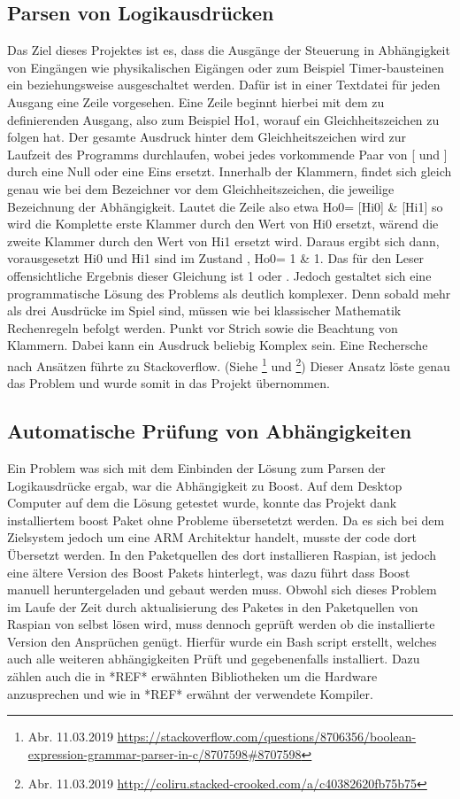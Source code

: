 \subsection{Parsen von Logikausdrücken}
Das Ziel dieses Projektes ist es, dass die Ausgänge der Steuerung in Abhängigkeit von Eingängen wie physikalischen Eigängen oder zum Beispiel Timer-bausteinen ein beziehungsweise ausgeschaltet werden. Dafür ist in einer Textdatei für jeden Ausgang eine Zeile vorgesehen. Eine Zeile beginnt hierbei mit dem zu definierenden Ausgang, also zum Beispiel Ho1, worauf ein Gleichheitszeichen zu folgen hat. Der gesamte Ausdruck hinter dem Gleichheitszeichen wird zur Laufzeit des Programms durchlaufen, wobei jedes vorkommende Paar von [ und ] durch eine Null oder eine Eins ersetzt. Innerhalb der Klammern, findet sich gleich genau wie bei dem Bezeichner vor dem Gleichheitszeichen, die jeweilige Bezeichnung der Abhängigkeit. Lautet die Zeile also etwa Ho0= [Hi0] \& [Hi1] so wird die Komplette erste Klammer durch den Wert von Hi0 ersetzt, wärend die zweite Klammer  durch den Wert von Hi1 ersetzt wird. Daraus ergibt sich dann, vorausgesetzt Hi0 und Hi1 sind im Zustand , Ho0= 1 \& 1. Das für den Leser offensichtliche Ergebnis dieser Gleichung ist 1 oder . Jedoch gestaltet sich eine programmatische Lösung des Problems als deutlich komplexer. Denn sobald mehr als drei Ausdrücke im Spiel sind, müssen wie bei klassischer Mathematik Rechenregeln befolgt werden. Punkt vor Strich sowie die Beachtung von Klammern. Dabei kann ein Ausdruck beliebig Komplex sein. Eine Rechersche nach Ansätzen führte zu Stackoverflow. (Siehe  
\footnote{Abr. 11.03.2019 \url{https://stackoverflow.com/questions/8706356/boolean-expression-grammar-parser-in-c/8707598\#8707598}}
 und  \footnote{Abr. 11.03.2019 \url{http://coliru.stacked-crooked.com/a/c40382620fb75b75}}) Dieser Ansatz löste genau das Problem und wurde somit in das Projekt übernommen. 
%
\subsection{Automatische Prüfung von Abhängigkeiten}
Ein Problem was sich mit dem Einbinden der Lösung zum Parsen der Logikausdrücke ergab, war die Abhängigkeit zu Boost. Auf dem Desktop Computer auf dem die Lösung getestet wurde, konnte das Projekt dank installiertem boost Paket ohne Probleme übersetetzt werden. Da es sich bei dem  Zielsystem jedoch um eine ARM Architektur handelt, musste der code dort Übersetzt werden. In den Paketquellen des dort installieren Raspian, ist jedoch eine ältere Version des Boost Pakets hinterlegt, was dazu führt dass Boost manuell heruntergeladen und gebaut werden muss. Obwohl sich dieses Problem im Laufe der Zeit durch aktualisierung des Paketes in den Paketquellen von Raspian von selbst lösen wird, muss dennoch geprüft werden ob die installierte Version den Ansprüchen genügt. Hierfür wurde ein Bash script erstellt, welches auch alle weiteren abhängigkeiten Prüft und gegebenenfalls installiert. Dazu zählen auch die in *REF* erwähnten Bibliotheken um die Hardware anzusprechen und wie in *REF* erwähnt der verwendete Kompiler. 
 
